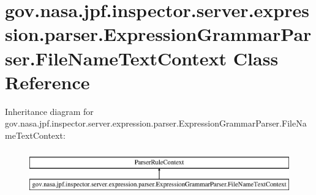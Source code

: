 \hypertarget{classgov_1_1nasa_1_1jpf_1_1inspector_1_1server_1_1expression_1_1parser_1_1_expression_grammar_parser_1_1_file_name_text_context}{}\section{gov.\+nasa.\+jpf.\+inspector.\+server.\+expression.\+parser.\+Expression\+Grammar\+Parser.\+File\+Name\+Text\+Context Class Reference}
\label{classgov_1_1nasa_1_1jpf_1_1inspector_1_1server_1_1expression_1_1parser_1_1_expression_grammar_parser_1_1_file_name_text_context}
Inheritance diagram for gov.\+nasa.\+jpf.\+inspector.\+server.\+expression.\+parser.\+Expression\+Grammar\+Parser.\+File\+Name\+Text\+Context\+:\begin{figure}[H]
\begin{center}
\leavevmode
\includegraphics[height=1.964912cm]{classgov_1_1nasa_1_1jpf_1_1inspector_1_1server_1_1expression_1_1parser_1_1_expression_grammar_parser_1_1_file_name_text_context}
\end{center}
\end{figure}
